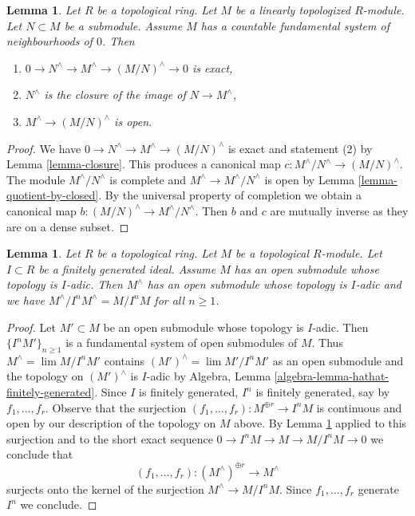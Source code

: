 \documentclass{stacks-project}
\newenvironment{reference}{\comment}{\endcomment}
\theoremstyle{plain}
\newtheorem{lemma}[subsection]{Lemma}
\theoremstyle{definition}
\theoremstyle{remark}
\numberwithin{equation}{subsection}
\def\lim{\mathop{\mathrm{lim}}\nolimits}
\begin{document}
\begin{lemma}
\label{lemma-ses}
\begin{reference}
\cite[Theorem 8.1]{Ma}
\end{reference}
Let $R$ be a topological ring. Let $M$ be a linearly topologized
$R$-module. Let $N \subset M$ be a submodule. Assume $M$ has a
countable fundamental system of neighbourhoods of $0$. Then
\begin{enumerate}
\item $0 \to N^\wedge \to M^\wedge \to (M/N)^\wedge \to 0$ is exact,
\item $N^\wedge$ is the closure of the image of $N \to M^\wedge$,
\item $M^\wedge \to (M/N)^\wedge$ is open.
\end{enumerate}
\end{lemma}

\begin{proof}
We have $0 \to N^\wedge \to M^\wedge \to (M/N)^\wedge$ is exact
and statement (2) by Lemma \ref{lemma-closure}.
This produces a canonical map $c : M^\wedge/N^\wedge \to (M/N)^\wedge$.
The module $M^\wedge/N^\wedge$ is complete and
$M^\wedge \to M^\wedge/N^\wedge$ is open by
Lemma \ref{lemma-quotient-by-closed}.
By the universal property of completion we obtain a canonical
map $b : (M/N)^\wedge \to M^\wedge/N^\wedge$.
Then $b$ and $c$ are mutually inverse as they are on a dense subset.
\end{proof}

\begin{lemma}
\label{lemma-completion-adic-star}
Let $R$ be a topological ring. Let $M$ be a topological $R$-module.
Let $I \subset R$ be a finitely generated ideal. Assume $M$
has an open submodule whose topology is $I$-adic. Then $M^\wedge$
has an open submodule whose topology is $I$-adic and we have
$M^\wedge/I^n M^\wedge = M/I^nM$ for all $n \geq 1$.
\end{lemma}

\begin{proof}
Let $M' \subset M$ be an open submodule whose topology is $I$-adic.
Then $\{I^nM'\}_{n \geq 1}$ is a fundamental system of open submodules
of $M$. Thus $M^\wedge = \lim M/I^nM'$ contains
$(M')^\wedge = \lim M'/I^nM'$
as an open submodule and the topology on $(M')^\wedge$ is
$I$-adic by Algebra, Lemma \ref{algebra-lemma-hathat-finitely-generated}.
Since $I$ is finitely generated, $I^n$ is finitely generated,
say by $f_1, \ldots, f_r$. Observe that the surjection
$(f_1, \ldots, f_r) : M^{\oplus r} \to I^n M$ is continuous
and open by our description of the topology on $M$ above.
By Lemma \ref{lemma-ses} applied to this surjection and to the
short exact sequence $0 \to I^nM \to M \to M/I^nM \to 0$
we conclude that
$$
(f_1, \ldots, f_r) :
(M^\wedge)^{\oplus r} \longrightarrow M^\wedge
$$
surjects onto the kernel of the surjection $M^\wedge \to M/I^nM$.
Since $f_1, \ldots, f_r$ generate $I^n$ we conclude.
\end{proof}
\end{document}
